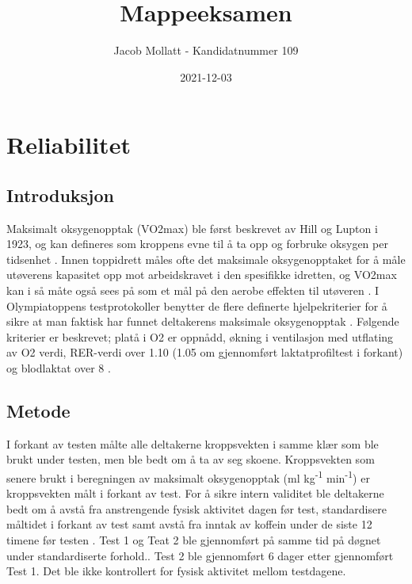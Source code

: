 \documentclass[
]{book}
\title{Mappeeksamen}
\author{Jacob Mollatt - Kandidatnummer 109}
\date{2021-12-03}
\begin{document}
\maketitle

{
\setcounter{tocdepth}{1}
\tableofcontents
}
\hypertarget{reliabilitet}{%
\chapter{Reliabilitet}\label{reliabilitet}}

\hypertarget{introduksjon}{%
\section{Introduksjon}\label{introduksjon}}

Maksimalt oksygenopptak (VO2max) ble først beskrevet av Hill og Lupton i 1923, og kan defineres som kroppens evne til å ta opp og forbruke oksygen per tidsenhet \citep{bassett2000, hill1923}. Innen toppidrett måles ofte det maksimale oksygenopptaket for å måle utøverens kapasitet opp mot arbeidskravet i den spesifikke idretten, og VO2max kan i så måte også sees på som et mål på den aerobe effekten til utøveren \citep{bassett2000}. I Olympiatoppens testprotokoller benytter de flere definerte hjelpekriterier for å sikre at man faktisk har funnet deltakerens maksimale oksygenopptak \citep{tønnessen2017}. Følgende kriterier er beskrevet; platå i O2 er oppnådd, økning i ventilasjon med utflating av O2 verdi, RER-verdi over 1.10 (1.05 om gjennomført laktatprofiltest i forkant) og blodlaktat over 8 \citep{tønnessen2017}.

\hypertarget{metode}{%
\section{Metode}\label{metode}}

I forkant av testen målte alle deltakerne kroppsvekten i samme klær som ble brukt under testen, men ble bedt om å ta av seg skoene. Kroppsvekten som senere brukt i beregningen av maksimalt oksygenopptak (ml kg\textsuperscript{-1} min\textsuperscript{-1}) er kroppsvekten målt i forkant av test. For å sikre intern validitet ble deltakerne bedt om å avstå fra anstrengende fysisk aktivitet dagen før test, standardisere måltidet i forkant av test samt avstå fra inntak av koffein under de siste 12 timene før testen \citep{halperin2015} . Test 1 og Teat 2 ble gjennomført på samme tid på døgnet under standardiserte forhold.. Test 2 ble gjennomført 6 dager etter gjennomført Test 1. Det ble ikke kontrollert for fysisk aktivitet mellom testdagene.
\end{document}
